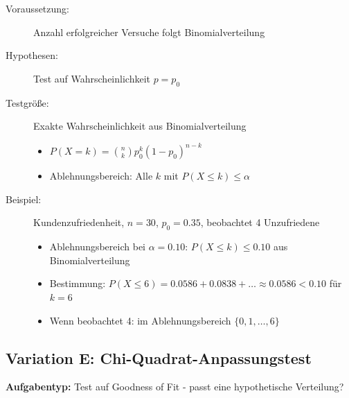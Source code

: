 \documentclass[12pt, a4paper, titlepage, ngerman]{scrartcl}
\begin{document}
\begin{description}
  \item[Voraussetzung:] Anzahl erfolgreicher Versuche folgt Binomialverteilung
  \item[Hypothesen:] Test auf Wahrscheinlichkeit $p = p_0$
  \item[Testgröße:] Exakte Wahrscheinlichkeit aus Binomialverteilung
    \begin{itemize}
      \item $P(X = k) = \binom{n}{k} p_0^k (1-p_0)^{n-k}$
      \item Ablehnungsbereich: Alle $k$ mit $P(X \leq k) \leq \alpha$
    \end{itemize}
  \item[Beispiel:] Kundenzufriedenheit, $n=30$, $p_0=0.35$, beobachtet 4 Unzufriedene
    \begin{itemize}
      \item Ablehnungsbereich bei $\alpha = 0.10$: $P(X \leq k) \leq 0.10$ aus Binomialverteilung
      \item Bestimmung: $P(X \leq 6) = 0.0586 + 0.0838 + \ldots \approx 0.0586 < 0.10$ für $k=6$
      \item Wenn beobachtet 4: im Ablehnungsbereich $\{0,1,\ldots,6\}$
    \end{itemize}
\end{description}

\subsection{Variation E: Chi-Quadrat-Anpassungstest}

\textbf{Aufgabentyp:} Test auf Goodness of Fit - passt eine hypothetische Verteilung?
\end{document}
